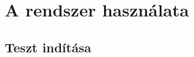 \chapter{A rendszer használata}\label{ch:HASZNALAT}


\section{Teszt indítása}\label{sec:TesztInditasa}






